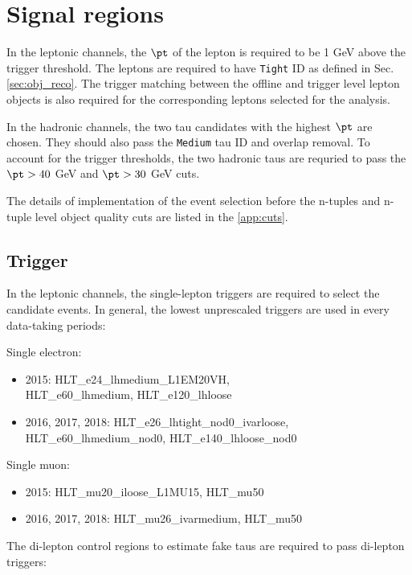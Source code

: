 \section{Signal regions}
\label{sec:selection}

In the leptonic channels, the $\pt$ of the lepton is required to be 1 GeV above the trigger threshold. The leptons are required to have \texttt{Tight} ID as defined in Sec. \ref{sec:obj_reco}. The trigger matching between the offline and trigger level lepton objects is also required for the corresponding leptons selected for the analysis.

In the hadronic channels, the two tau candidates with the highest $\pt$ are chosen. They should also pass the \texttt{Medium} tau ID and overlap removal. To account for the trigger thresholds, the two hadronic taus are requried to pass the $\pt>40$ GeV and $\pt>30$ GeV cuts.

The details of implementation of the event selection before the n-tuples and n-tuple level object quality cuts are listed in the \ref{app:cuts}.

\subsection{Trigger}
\label{sec:trigger}

In the leptonic channels, the single-lepton triggers are required to select the candidate events. In general, the lowest unprescaled triggers are used in every data-taking periods:

Single electron:

\begin{itemize}
\item 2015: HLT\_e24\_lhmedium\_L1EM20VH,\\
HLT\_e60\_lhmedium, HLT\_e120\_lhloose
\item 2016, 2017, 2018: HLT\_e26\_lhtight\_nod0\_ivarloose,\\
HLT\_e60\_lhmedium\_nod0, HLT\_e140\_lhloose\_nod0
\end{itemize}

Single muon:

\begin{itemize}
\item 2015: HLT\_mu20\_iloose\_L1MU15, HLT\_mu50
\item 2016, 2017, 2018: HLT\_mu26\_ivarmedium, HLT\_mu50
\end{itemize}

The di-lepton control regions to estimate fake taus are required to pass di-lepton triggers:


